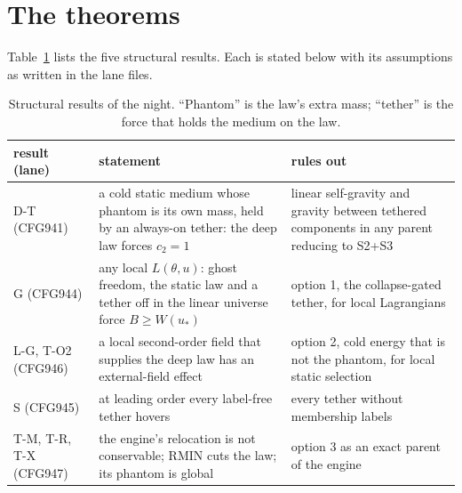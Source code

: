 \documentclass[10pt]{article}
\begin{document}
\section{The theorems}
Table~\ref{tab:thm} lists the five structural results. Each is stated below with its assumptions as written in the lane files.
\begin{table}[t]\centering\small
\caption{Structural results of the night. ``Phantom'' is the law's extra mass; ``tether'' is the force that holds the medium on the law.}\label{tab:thm}
\begin{tabular}{p{}p{}p{}}
\toprule
result (lane) & statement & rules out\\
\midrule
D-T (CFG941) & a cold static medium whose phantom is its own mass, held by an always-on tether: the deep law forces $c_2=1$ & linear self-gravity and gravity between tethered components in any parent reducing to S2+S3\\
G (CFG944) & any local $L(\theta,u)$: ghost freedom, the static law and a tether off in the linear universe force $B\ge W(u_*)$ & option 1, the collapse-gated tether, for local Lagrangians\\
L-G, T-O2 (CFG946) & a local second-order field that supplies the deep law has an external-field effect & option 2, cold energy that is not the phantom, for local static selection\\
S (CFG945) & at leading order every label-free tether hovers & every tether without membership labels\\
T-M, T-R, T-X (CFG947) & the engine's relocation is not conservable; RMIN cuts the law; its phantom is global & option 3 as an exact parent of the engine\\
\bottomrule
\end{tabular}
\end{table}
\end{document}
